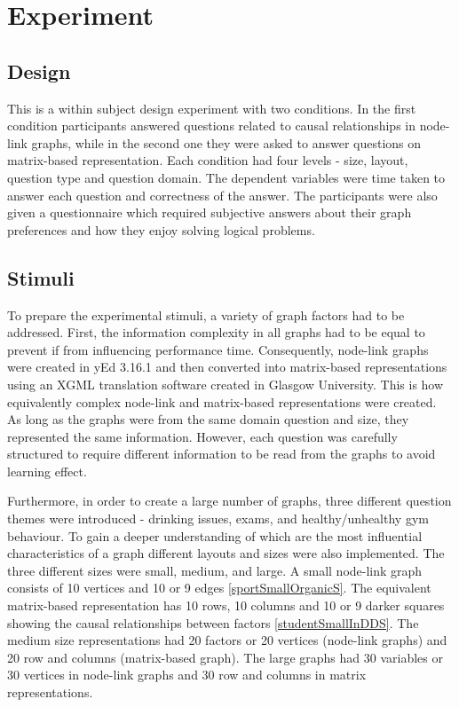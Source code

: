 \documentclass{l4proj}
\begin{document}
\chapter{Experiment}
\section{Design}

This is a within subject design experiment with two conditions. In the first condition participants answered questions related to causal relationships in node-link graphs, while in the second one they were asked to answer questions on matrix-based representation. Each condition had four levels - size, layout, question type and question domain. The dependent variables were time taken to answer each question and correctness of the answer. The participants were also given a questionnaire which required subjective answers about their graph preferences and how they enjoy solving logical problems. 

\section{Stimuli}

To prepare the experimental stimuli, a variety of graph factors had to be addressed. First, the information complexity in all graphs had to be equal to prevent if from influencing performance time. Consequently, node-link graphs were created in yEd 3.16.1 and then converted into matrix-based representations using an XGML translation software created in Glasgow University. This is how equivalently complex node-link and matrix-based representations were created. As long as the graphs were from the same domain question and size, they represented the same information. However, each question was carefully structured to require different information to be read from the graphs to avoid learning effect. 

Furthermore, in order to create a large number of graphs, three different question themes were introduced - drinking issues, exams, and healthy/unhealthy gym behaviour. To gain a deeper understanding of which are the most influential characteristics of a graph different layouts and sizes were also implemented. The three different sizes were small, medium, and large. A small node-link graph consists of 10 vertices and 10 or 9 edges \ref{sportSmallOrganicS}. The equivalent matrix-based representation has 10 rows, 10 columns and 10 or 9 darker squares showing the causal relationships between factors \ref{studentSmallInDDS}. The medium size representations had 20 factors or 20 vertices (node-link graphs) and 20 row and columns (matrix-based graph). The large graphs had 30 variables or 30 vertices in node-link graphs and 30 row and columns in matrix representations. 
\end{document}
